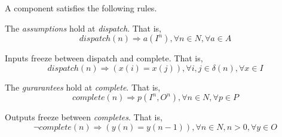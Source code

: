 A component satisfies the following rules.

The \emph{assumptions} hold at \emph{dispatch}. That is,
\begin{equation} 
\label{eqn:assumption}
dispatch(n) \Rightarrow a(I^n), \forall n\in N, \forall a \in A
\end{equation}

Inputs freeze between dispatch and complete. That is,
\begin{equation} 
\label{eqn:inputfreeze}
dispatch(n) \Rightarrow (x(i) = x(j)), \forall i,j\in \delta(n), \forall x \in I
\end{equation}

The \emph{gurarantees} hold at \emph{complete}. That is,
\begin{equation} 
\label{eqn:guarantee}
complete(n) \Rightarrow p(I^n, O^n), \forall n\in N, \forall p \in P
\end{equation}

Outputs freeze between \emph{completes}. That is,
\begin{equation} 
\label{eqn:outputfreeze}
\lnot complete(n) \Rightarrow (y(n) = y(n-1)), \forall n \in N, n>0, \forall y \in O
\end{equation}


